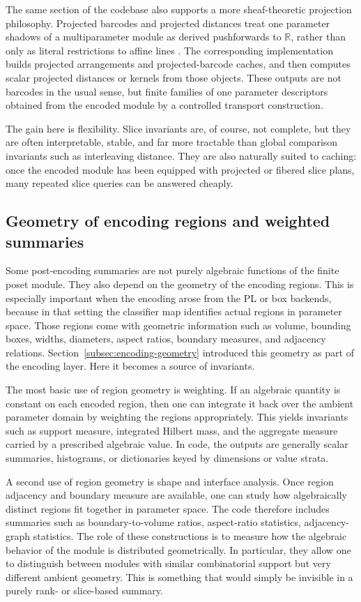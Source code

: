 \documentclass[11pt]{article}
\newcommand{\R}{\mathbb{R}}
\theoremstyle{definition}
\theoremstyle{remark}
\begin{document}
The same section of the codebase also supports a more sheaf-theoretic projection philosophy.  Projected barcodes and projected distances treat one parameter shadows of a multiparameter module as derived pushforwards to $\R$, rather than only as literal restrictions to affine lines \cite{BP24}.  The corresponding implementation builds projected arrangements and projected-barcode caches, and then computes scalar projected distances or kernels from those objects.  These outputs are not barcodes in the usual sense, but finite families of one parameter descriptors obtained from the encoded module by a controlled transport construction.

The gain here is flexibility.  Slice invariants are, of course, not complete, but they are often interpretable, stable, and far more tractable than global comparison invariants such as interleaving distance.  They are also naturally suited to caching: once the encoded module has been equipped with projected or fibered slice plans, many repeated slice queries can be answered cheaply.

\subsection{Geometry of encoding regions and weighted summaries}

Some post-encoding summaries are not purely algebraic functions of the finite poset module.  They also depend on the geometry of the encoding regions.  This is especially important when the encoding arose from the PL or box backends, because in that setting the classifier map identifies actual regions in parameter space.  Those regions come with geometric information such as volume, bounding boxes, widths, diameters, aspect ratios, boundary measures, and adjacency relations.  Section~\ref{subsec:encoding-geometry} introduced this geometry as part of the encoding layer.  Here it becomes a source of invariants.

The most basic use of region geometry is weighting.  If an algebraic quantity is constant on each encoded region, then one can integrate it back over the ambient parameter domain by weighting the regions appropriately.  This yields invariants such as support measure, integrated Hilbert mass, and the aggregate measure carried by a prescribed algebraic value.  In code, the outputs are generally scalar summaries, histograms, or dictionaries keyed by dimensions or value strata.

A second use of region geometry is shape and interface analysis.  Once region adjacency and boundary measure are available, one can study how algebraically distinct regions fit together in parameter space.  The code therefore includes summaries such as boundary-to-volume ratios, aspect-ratio statistics, adjacency-graph statistics.  The role of these constructions is to measure how the algebraic behavior of the module is distributed geometrically.  In particular, they allow one to distinguish between modules with similar combinatorial support but very different ambient geometry.  This is something that would simply be invisible in a purely rank- or slice-based summary.
\end{document}
